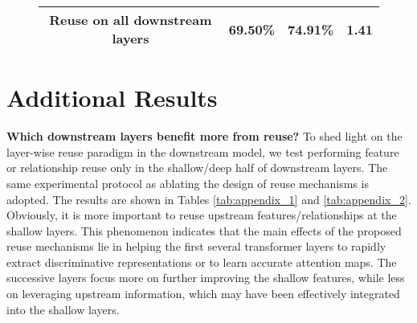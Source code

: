 \documentclass{article}
\begin{document}
\begin{figure}[h]
\begin{center}
\begin{minipage}{0.72\columnwidth}
\begin{footnotesize}
{{\begin{tabular}{c|ccc}
          \midrule
          Reuse on all downstream layers & 69.50\%   & \textbf{74.91\%} & {1.41} \\
          \bottomrule
      \end{tabular}}}
      \end{footnotesize}
      \end{minipage}
      \vskip 0.15in
      \begin{minipage}{0.8\columnwidth}
        \centering
    \begin{footnotesize}
    \vskip -0.075in 
    \label{tab:appendix_3}
    \end{footnotesize}
    \end{minipage}
  \end{center}
  \vskip -0.1in
\end{figure}

\section{Additional Results}
\textbf{Which downstream layers benefit more from reuse?} 
To shed light on the layer-wise reuse paradigm in the downstream model, we test performing feature or relationship reuse only in the shallow/deep half of downstream layers. The same experimental protocol as ablating the design of reuse mechanisms is adopted. The results are shown in Tables \ref{tab:appendix_1} and \ref{tab:appendix_2}. Obviously, it is more important to reuse upstream features/relationships at the shallow layers. This phenomenon indicates that the main effects of the proposed reuse mechanisms lie in helping the first several transformer layers to rapidly extract discriminative representations or to learn accurate attention maps. The successive layers focus more on further improving the shallow features, while less on leveraging upstream information, which may have been effectively integrated into the shallow layers.
\end{document}
